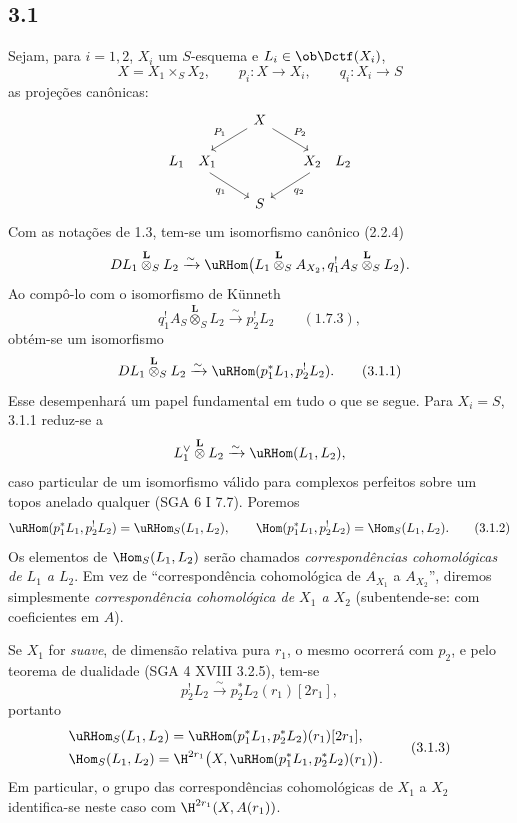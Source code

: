 \subsection*{3.1}
Sejam, para $i=1,2$, $X_i$ um $S$-esquema e $L_i\in\ob\Dctf(X_i)$,
\[
X=X_1\times_S X_2,
\qquad
p_i:X\longrightarrow X_i,
\qquad
q_i:X_i\longrightarrow S
\]
as projeções canônicas:
\[
\begin{tikzcd}[column sep=1.8em,row sep=1.5em]
& X \arrow[dl,"P_1"'] \arrow[dr,"P_2"] & \\
L_1\quad X_1 \arrow[dr,"q_1"'] & & X_2\quad L_2 \arrow[dl,"q_2"] \\
& S &
\end{tikzcd}
\]
Com as notações de 1.3, tem-se um isomorfismo canônico (2.2.4)
\[
DL_1\overset{\mathbf L}{\otimes}_S L_2
\xrightarrow{\sim}
\uRHom\bigl(L_1\overset{\mathbf L}{\otimes}_S A_{X_2},
q_1^!A_S\overset{\mathbf L}{\otimes}_S L_2\bigr).
\]
Ao compô-lo com o isomorfismo de Künneth
\[
q_1^!A_S\overset{\mathbf L}{\otimes}_S L_2
\xrightarrow{\sim}p_2^!L_2 \qquad (1.7.3),
\]
obtém-se um isomorfismo
\begin{equation}
DL_1\overset{\mathbf L}{\otimes}_S L_2
\xrightarrow{\sim}
\uRHom(p_1^*L_1,p_2^!L_2).
\tag{3.1.1}
\end{equation}
Esse desempenhará um papel fundamental em tudo o que se segue. Para $X_i=S$, 3.1.1 reduz-se a
\[
L_1^\vee\overset{\mathbf L}{\otimes}L_2\xrightarrow{\sim}\uRHom(L_1,L_2),
\]
caso particular de um isomorfismo válido para complexos perfeitos sobre um topos anelado qualquer (SGA 6 I 7.7). Poremos
\begin{equation}
\uRHom(p_1^*L_1,p_2^!L_2)=\uRHom_S(L_1,L_2),
\qquad
\Hom(p_1^*L_1,p_2^!L_2)=\Hom_S(L_1,L_2).
\tag{3.1.2}
\end{equation}
Os elementos de $\Hom_S(L_1,L_2)$ serão chamados \emph{correspondências cohomológicas de $L_1$ a $L_2$}. Em vez de ``correspondência cohomológica de $A_{X_1}$ a $A_{X_2}$'', diremos simplesmente \emph{correspondência cohomológica de $X_1$ a $X_2$} (subentende-se: com coeficientes em $A$).

Se $X_1$ for \emph{suave}, de dimensão relativa pura $r_1$, o mesmo ocorrerá com $p_2$, e pelo teorema de dualidade (SGA 4 XVIII 3.2.5), tem-se
\[
p_2^!L_2\xrightarrow{\sim}p_2^*L_2(r_1)[2r_1],
\]
portanto
\begin{equation}
\begin{aligned}
&\uRHom_S(L_1,L_2)=\uRHom(p_1^*L_1,p_2^*L_2)(r_1)[2r_1],\\
&\Hom_S(L_1,L_2)=\H^{2r_1}\bigl(X,\uRHom(p_1^*L_1,p_2^*L_2)(r_1)\bigr).
\end{aligned}
\tag{3.1.3}
\end{equation}
Em particular, o grupo das correspondências cohomológicas de $X_1$ a $X_2$ identifica-se neste caso com $\H^{2r_1}(X,A(r_1))$.

